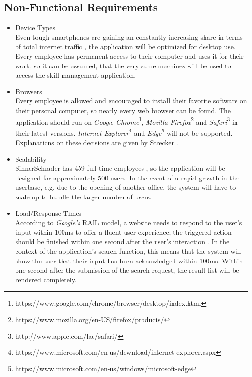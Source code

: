 \newpage

\subsection{Non-Functional Requirements}
\begin{itemize}
	\item Device Types\\
		Even tough smartphones are gaining an constantly increasing share in terms of total internet traffic \cite{allthemobile},
		the application will be optimized for desktop use. Every employee has permanent access to their computer and uses it
		for their work, so it can be assumed, that the very same machines will be used to access the skill management application.
	\item Browsers\\
		Every employee is allowed and encouraged to install their favorite software on their personal computer, so nearly every web browser can be found.
		The application should run on \textit{Google Chrome}\footnote{https://www.google.com/chrome/browser/desktop/index.html}, \textit{Mozilla Firefox}\footnote{https://www.mozilla.org/en-US/firefox/products/} and \textit{Safari}\footnote{http://www.apple.com/lae/safari/} in their latest versions. \textit{Internet Explorer}\footnote{https://www.microsoft.com/en-us/download/internet-explorer.aspx} and \textit{Edge}\footnote{https://www.microsoft.com/en-us/windows/microsoft-edge} will not be supported. Explanations on these decisions are given by Strecker \cite{strecker}.
	\item Scalability\\
		SinnerSchrader has 459 full-time employees \cite{quartalsbericht}, so the application will be designed for approximately 500 users. In the event of a rapid growth in the userbase, e.g. due to the opening of another office, the system will have to scale up to handle the larger number of users.
	\item Load/Response Times\\
		According to \textit{Google's} RAIL model, a website needs to respond to the user's input within 100ms to offer a fluent user experience; the triggered action should be finished within one second after the user's interaction \cite{RAIL}. In the context of the application's search function, this means that the system will show the user that their input has been acknowledged within 100ms. Within one second after the submission of the search request, the result list will be rendered completely. 	\label{require_times}
\end{itemize}



